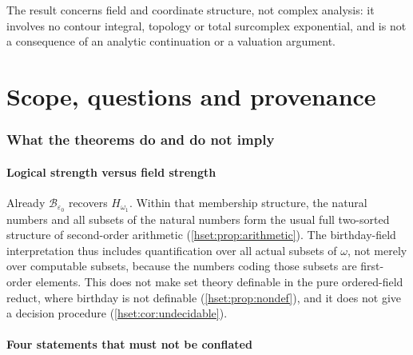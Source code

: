 \documentclass[11pt,letterpaper]{article}
\theoremstyle{definition}
\theoremstyle{remark}
\newcommand{\B}{\mathcal B}
\begin{document}
The result concerns field and coordinate structure, not complex analysis: it
involves no contour integral, topology or total surcomplex exponential, and is
not a consequence of an analytic continuation or a valuation argument.

\part{Scope, questions and provenance}\label{hset:part:scope}

\section{What the theorems do and do not imply}
\label{hset:sec:scope}

\subsection{Logical strength versus field strength}

Already $\B_{\varepsilon_0}$ recovers $H_{\omega_1}$. Within that membership
structure, the natural numbers and all subsets of the natural numbers form the
usual full two-sorted structure of second-order arithmetic
(\cref{hset:prop:arithmetic}). The birthday-field interpretation thus includes
quantification over all actual subsets of $\omega$, not merely over computable
subsets, because the numbers coding those subsets are first-order elements.
This does not make set theory definable in the pure ordered-field reduct, where
birthday is not definable (\cref{hset:prop:nondef}), and it does not give a
decision procedure (\cref{hset:cor:undecidable}).

\subsection{Four statements that must not be conflated}
\end{document}
